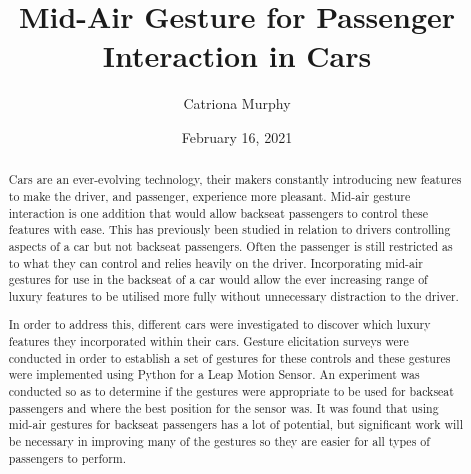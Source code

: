 \documentclass{l4proj}
\begin{document}
\title{Mid-Air Gesture for Passenger Interaction in Cars} %
\author{Catriona Murphy}
\date{February 16, 2021}

\maketitle

\begin{abstract}
    Cars are an ever-evolving technology, their makers constantly introducing new features to make the driver, and passenger, experience more pleasant. Mid-air gesture interaction is one addition that would allow backseat passengers to control these features with ease.  This has previously been studied in relation to drivers controlling aspects of a car but not backseat passengers. Often the passenger is still restricted as to what they can control and relies heavily on the driver. Incorporating mid-air gestures for use in the backseat of a car would allow the ever increasing range of luxury features to be utilised more fully without unnecessary distraction to the driver.
    
    In order to address this, different cars were investigated to discover which luxury features they incorporated within their cars. Gesture elicitation surveys were conducted in order to establish a set of gestures for these controls and these gestures were implemented using Python for a Leap Motion Sensor. An experiment was conducted so as to determine if the gestures were appropriate to be used for backseat passengers and where the best position for the sensor was. It was found that using mid-air gestures for backseat passengers has a lot of potential, but significant work will be necessary in improving many of the gestures so they are easier for all types of passengers to perform.
\end{abstract}

%
%
\end{document}
